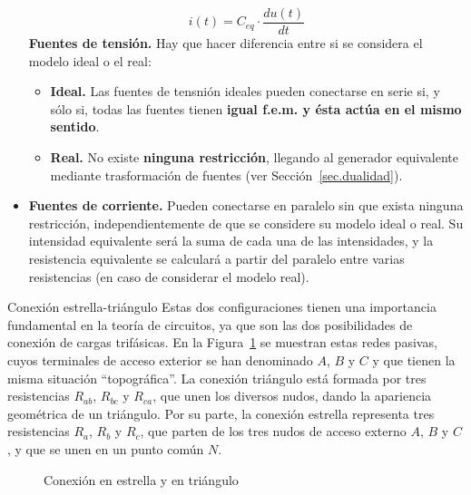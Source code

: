 \documentclass[11pt]{book} %
\makeatletter
\numberwithin{dummy}{section}
\theoremstyle{ocrenumbox}
\theoremstyle{blacknumex}
\theoremstyle{blacknumbox}
\theoremstyle{ocrenum}
\renewcommand{\subsubsection}{\@startsection {subsubsection}{3}{\z@}
{-2ex \@plus -0.1ex \@minus -.2ex}
{.2ex \@plus.2ex }
{\normalfont\small\sffamily\bfseries}}
\makeatother
\begin{document}
\begin{itemize}
\begin{equation*}
			i(t) = C_{eq} \cdot \frac{du(t)}{dt}
		\end{equation*}
		\textbf{Fuentes de tensión.} Hay que hacer diferencia entre si se considera el modelo ideal o el real:
		\begin{itemize}
			\item \textbf{Ideal.} Las fuentes de tensnión ideales pueden conectarse en serie si, y sólo si, todas las fuentes tienen \textbf{igual f.e.m. y ésta actúa en el mismo sentido}.
			\item \textbf{Real.} No existe \textbf{ninguna restricción}, llegando al generador equivalente mediante trasformación de fuentes (ver Sección~\ref{sec.dualidad}). 
		\end{itemize}
		\item \textbf{Fuentes de corriente.} Pueden conectarse en paralelo sin que exista ninguna restricción, independientemente de que se considere su modelo ideal o real. Su intensidad equivalente será la suma de cada una de las intensidades, y la resistencia equivalente se calculará a partir del paralelo entre varias resistencias (en caso de considerar el modelo real).
	\end{itemize}
	
	
	
	
	\subsubsection{Conexión estrella-triángulo}
	Estas dos configuraciones tienen una importancia fundamental en la teoría de circuitos, ya que son las dos posibilidades de conexión de cargas trifásicas. En la Figura~\ref{fig.estrella-triangulo} se muestran estas redes pasivas, cuyos terminales de acceso exterior
	se han denominado $A$, $B$ y $C$ y que tienen la misma situación ``topográfica''. La conexión triángulo está
	formada por tres resistencias $R_{ab}$, $R_{bc}$ y $R_{ca}$, que unen los diversos nudos, dando la apariencia
	geométrica de un triángulo. Por su parte, la conexión
	estrella representa tres resistencias $R_a$, $R_b$ y $R_c$, que parten de los tres nudos de acceso
	externo $A$, $B$ y $C$, y que se unen en un punto común $N$. 
	\begin{figure}[htbp]
		\centering
		\hfil
		\caption{Conexión en estrella y en triángulo}
		\label{fig.estrella-triangulo}
	\end{figure}
	
\end{document}
